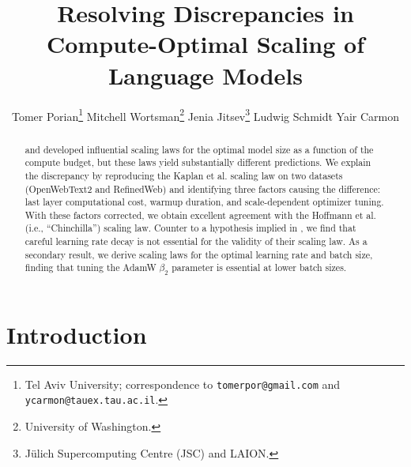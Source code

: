 \documentclass{article}
\title{Resolving Discrepancies in Compute-Optimal Scaling of 
 Language Models}
\author{
        Tomer Porian\thanks{Tel Aviv University; correspondence to \texttt{tomerpor@gmail.com} and \texttt{ycarmon@tauex.tau.ac.il}.} 
        \And
        Mitchell Wortsman\thanks{University of Washington.} 
        \And
        Jenia Jitsev\thanks{Jülich Supercomputing Centre (JSC) and LAION.}
        \And
        Ludwig Schmidt\footnotemark[2]
        \And 
        Yair Carmon\footnotemark[1] 
    }
\makeatletter
\newcommand{\neurips}[1]{foo}
\newcommand{\workshop}[1]{baz}
\renewcommand{\neurips}[1]{\ignorespaces}%
\renewcommand{\workshop}[1]{\ignorespaces}%
\renewcommand{\neurips}[1]{\ignorespaces}%
\renewcommand{\workshop}[1]{#1}%
\renewcommand{\neurips}[1]{#1}%
\renewcommand{\workshop}[1]{\ignorespaces}%
\theoremstyle{plain}
\theoremstyle{definition}
\theoremstyle{remark}
\newcommand{\Kaplan}{Kaplan et al.\@\xspace}
\newcommand{\Hoffmann}{Hoffmann et al.\@\xspace}
\makeatother
\begin{document}
\neurips{\maketitle}
\workshop{
    \twocolumn[
    \icmltitle{Resolving Discrepancies in Compute-Optimal Scaling of 
    Language Models}
    
    \begin{icmlauthorlist}
        \icmlauthor{Tomer Porian}{tau}
        \icmlauthor{Mitchell Wortsman}{uw}
        \icmlauthor{Jenia Jitsev}{JSC}
        \icmlauthor{Ludwig Schmidt}{uw}
        \icmlauthor{Yair Carmon}{tau}
    \end{icmlauthorlist}

    \icmlaffiliation{tau}{Tel Aviv University, Israel}
    \icmlaffiliation{JSC}{Jülich Supercomputing Centre, Germany}
    \icmlaffiliation{uw}{University of Washington, USA}

    \icmlcorrespondingauthor{Tomer Porian}{tomerpor@gmail.com}
    \icmlcorrespondingauthor{Yair Carmon}{ycarmon@tauex.tau.ac.il}
    \vskip 0.3in
    ]
    \printAffiliationsAndNotice{}
}

\begin{abstract}
\citet{kaplan2020scaling} and \citet{hoffmann2022empirical} developed influential scaling laws for the optimal model size as a function of the compute budget, but these laws yield substantially different predictions. 
We explain the discrepancy by reproducing the \Kaplan scaling law on two datasets (OpenWebText2 and RefinedWeb) and identifying three factors causing the difference: last layer computational cost, warmup duration, and scale-dependent optimizer tuning. 
With these factors corrected, we obtain excellent agreement with the \Hoffmann (i.e., ``Chinchilla'') scaling law. 
Counter to a hypothesis implied in \citet{hoffmann2022empirical}, we find that careful learning rate decay is not essential for the validity of their scaling law.
As a secondary result, we derive scaling laws for the optimal learning rate and batch size, finding that tuning the AdamW $\beta_2$ parameter is essential at lower batch sizes. 

\end{abstract}

%
\section{Introduction}\label{sec:intro}
\end{document}

